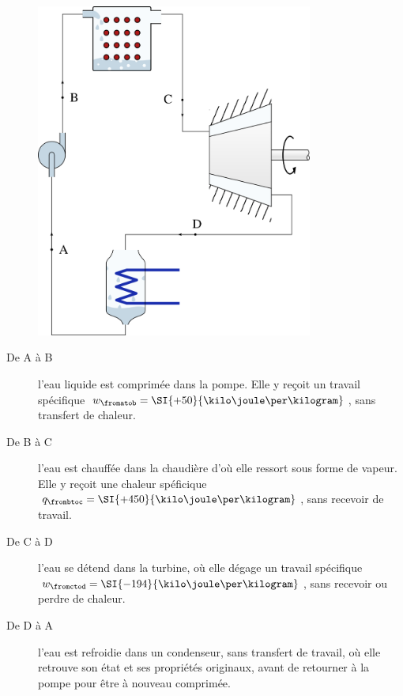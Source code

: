 			\begin{figure}
			\begin{center}
				\includegraphics[height=11cm]{images/circuit_rankine.png}
			\end{center}
			\label{fig_cycle_rankine_chap_un}
		\end{figure}

		\begin{description}
			\item[De A à B] l’eau liquide est comprimée dans la pompe. Elle y reçoit un travail spécifique $w_\fromatob = \SI{+50}{\kilo\joule\per\kilogram}$, sans transfert de chaleur.
			\item[De B à C] l’eau est chauffée dans la chaudière d’où elle ressort sous forme de vapeur. Elle y reçoit une chaleur spéficique $q_\frombtoc = \SI{+450}{\kilo\joule\per\kilogram}$, sans recevoir de travail.
			\item[De C à D] l’eau se détend dans la turbine, où elle dégage un travail spécifique $w_\fromctod = \SI{-194}{\kilo\joule\per\kilogram}$, sans recevoir ou perdre de chaleur.
			\item[De D à A] l’eau est refroidie dans un condenseur, sans transfert de travail, où elle retrouve son état et ses propriétés originaux, avant de retourner à la pompe pour être à nouveau comprimée.
		\end{description}

